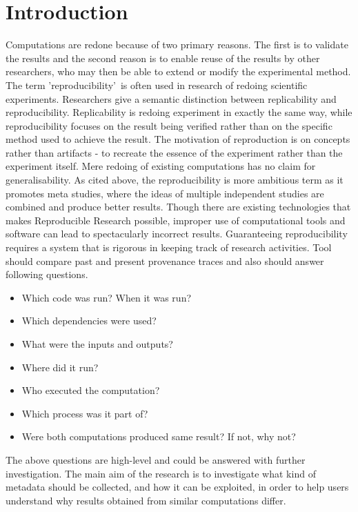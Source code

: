 \documentclass[6pt,,a4paper]{article}
\begin{document}
\section{\textbf{Introduction}}
Computations are redone because of two primary reasons. The first is to validate the results and the second reason is to enable reuse of the results by other researchers, who may then be able to extend or modify the experimental method. The term 'reproducibility'\, is often used in research of redoing scientific experiments. Researchers give a semantic distinction between replicability and reproducibility. Replicability is redoing experiment in exactly the same way, while reproducibility focuses on the result being verified rather than on the specific method used to achieve the result. The motivation of reproduction is on concepts rather than artifacts - to recreate the essence of the experiment rather than the experiment itself. Mere redoing of existing computations has no claim for generalisability. As cited above, the reproducibility is more ambitious term as it promotes meta studies, where the ideas of multiple independent studies are combined and produce better results. Though there are existing technologies that makes Reproducible Research possible, improper use of computational tools and software can lead to spectacularly incorrect results. Guaranteeing reproducibility requires a system that is rigorous in keeping track of research activities. Tool should compare past and present provenance traces and also should answer following questions.
\begin{itemize} \label{data}
       \item Which code was run? When it was run?
        \item Which dependencies were used?
          \item What were the inputs and outputs?
	 \item Where did it run?
	 \item Who executed the computation?
 	 \item Which process was it part of?
       	 \item Were both computations produced same result? If not, why not?
\end{itemize}
The above questions are high-level and could be answered with further investigation. The main aim of the research is to investigate what kind of metadata should be collected, and how it can be exploited, in order to help users understand why results obtained from similar computations differ. 
\end{document}
